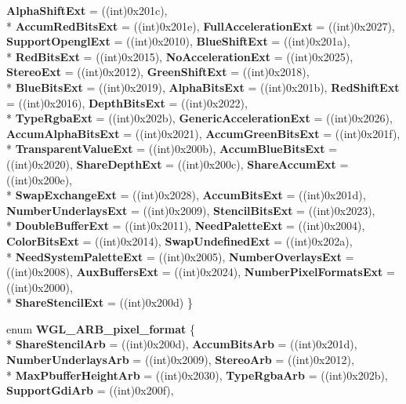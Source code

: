 \begin{DoxyCompactItemize}
{\bfseries Alpha\-Shift\-Ext} = ((int)0x201c), 
\\*
{\bfseries Accum\-Red\-Bits\-Ext} = ((int)0x201e), 
{\bfseries Full\-Acceleration\-Ext} = ((int)0x2027), 
{\bfseries Support\-Opengl\-Ext} = ((int)0x2010), 
{\bfseries Blue\-Shift\-Ext} = ((int)0x201a), 
\\*
{\bfseries Red\-Bits\-Ext} = ((int)0x2015), 
{\bfseries No\-Acceleration\-Ext} = ((int)0x2025), 
{\bfseries Stereo\-Ext} = ((int)0x2012), 
{\bfseries Green\-Shift\-Ext} = ((int)0x2018), 
\\*
{\bfseries Blue\-Bits\-Ext} = ((int)0x2019), 
{\bfseries Alpha\-Bits\-Ext} = ((int)0x201b), 
{\bfseries Red\-Shift\-Ext} = ((int)0x2016), 
{\bfseries Depth\-Bits\-Ext} = ((int)0x2022), 
\\*
{\bfseries Type\-Rgba\-Ext} = ((int)0x202b), 
{\bfseries Generic\-Acceleration\-Ext} = ((int)0x2026), 
{\bfseries Accum\-Alpha\-Bits\-Ext} = ((int)0x2021), 
{\bfseries Accum\-Green\-Bits\-Ext} = ((int)0x201f), 
\\*
{\bfseries Transparent\-Value\-Ext} = ((int)0x200b), 
{\bfseries Accum\-Blue\-Bits\-Ext} = ((int)0x2020), 
{\bfseries Share\-Depth\-Ext} = ((int)0x200c), 
{\bfseries Share\-Accum\-Ext} = ((int)0x200e), 
\\*
{\bfseries Swap\-Exchange\-Ext} = ((int)0x2028), 
{\bfseries Accum\-Bits\-Ext} = ((int)0x201d), 
{\bfseries Number\-Underlays\-Ext} = ((int)0x2009), 
{\bfseries Stencil\-Bits\-Ext} = ((int)0x2023), 
\\*
{\bfseries Double\-Buffer\-Ext} = ((int)0x2011), 
{\bfseries Need\-Palette\-Ext} = ((int)0x2004), 
{\bfseries Color\-Bits\-Ext} = ((int)0x2014), 
{\bfseries Swap\-Undefined\-Ext} = ((int)0x202a), 
\\*
{\bfseries Need\-System\-Palette\-Ext} = ((int)0x2005), 
{\bfseries Number\-Overlays\-Ext} = ((int)0x2008), 
{\bfseries Aux\-Buffers\-Ext} = ((int)0x2024), 
{\bfseries Number\-Pixel\-Formats\-Ext} = ((int)0x2000), 
\\*
{\bfseries Share\-Stencil\-Ext} = ((int)0x200d)
 \}
\item 
enum {\bfseries W\-G\-L\-\_\-\-A\-R\-B\-\_\-pixel\-\_\-format} \{ \\*
{\bfseries Share\-Stencil\-Arb} = ((int)0x200d), 
{\bfseries Accum\-Bits\-Arb} = ((int)0x201d), 
{\bfseries Number\-Underlays\-Arb} = ((int)0x2009), 
{\bfseries Stereo\-Arb} = ((int)0x2012), 
\\*
{\bfseries Max\-Pbuffer\-Height\-Arb} = ((int)0x2030), 
{\bfseries Type\-Rgba\-Arb} = ((int)0x202b), 
{\bfseries Support\-Gdi\-Arb} = ((int)0x200f), 

\end{DoxyCompactItemize}
